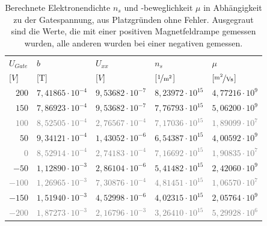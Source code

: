 \begin{table}[h]
	\centering
	\begin{tabular}{|r|r|l|r|r|}
		\hline
		\multicolumn{1}{|l|}{\cellcolor{black!30} $U_{Gate}$ } & \multicolumn{1}{|l|}{\cellcolor{black!30} $b$ } & \multicolumn{1}{|l|}{\cellcolor{black!30} $U_{xx}$ } & \multicolumn{1}{|l|}{\cellcolor{black!30} $n_s$ } & \multicolumn{1}{|l|}{\cellcolor{black!30} $\mu$ } \\
		\multicolumn{1}{|l|}{\cellcolor{black!30} [$\unit{V}$] } &  \multicolumn{1}{|l|}{\cellcolor{black!30} [\unit{T}] } &
		\multicolumn{1}{|l|}{\cellcolor{black!30} [$\unit{V}$] } &  \multicolumn{1}{|l|}{\cellcolor{black!30} [$\unitfrac{1}{m^2}$] } & \multicolumn{1}{|l|}{\cellcolor{black!30} [$\unitfrac{m^2}{Vs}$] } \\ \hline
		$ 200 $  & $ 7,41865\cdot 10^{-4} $  & $ 9,53682\cdot 10^{-7} $  & $ 8,23972\cdot 10^{15} $  & $ 4,77216\cdot 10^{9} $  \\ 
		$ 150 $  & $ 7,86923\cdot 10^{-4} $  & $ 9,53682\cdot 10^{-7} $  & $ 7,76793\cdot 10^{15} $  & $ 5,06200\cdot 10^{9} $  \\ 
		\textcolor{gray}{$ 100 $}  & \textcolor{gray}{$ 8,52505\cdot 10^{-4} $}  & \textcolor{gray}{$ 2,76567\cdot 10^{-4} $}  & \textcolor{gray}{$ 7,17036\cdot 10^{15} $}  & \textcolor{gray}{$ 1,89099\cdot 10^{7} $}  \\ 
		$ 50 $  & $ 9,34121\cdot 10^{-4} $  & $ 1,43052\cdot 10^{-6} $  & $ 6,54387\cdot 10^{15} $  & $ 4,00592\cdot 10^{9} $  \\ 
		\textcolor{gray}{$ 0 $}  & \textcolor{gray}{$ 8,52914\cdot 10^{-4} $}  & \textcolor{gray}{$ 2,74183\cdot 10^{-4} $}  & \textcolor{gray}{$ 7,16692\cdot 10^{15} $}  & \textcolor{gray}{$ 1,90835\cdot 10^{7} $}  \\ 
		$ -50 $  & $ 1,12890\cdot 10^{-3} $  & $ 2,86104\cdot 10^{-6} $  & $ 5,41482\cdot 10^{15} $  & $ 2,42060\cdot 10^{9} $  \\ 
		\textcolor{gray}{$ -100 $}  & \textcolor{gray}{$ 1,26965\cdot 10^{-3} $}  & \textcolor{gray}{$ 7,30876\cdot 10^{-4} $}  & \textcolor{gray}{$ 4,81451\cdot 10^{15} $}  & \textcolor{gray}{$ 1,06570\cdot 10^{7} $}  \\ 
		$ -150 $  & $ 1,51940\cdot 10^{-3} $  & $ 4,52998\cdot 10^{-6} $  & $ 4,02315\cdot 10^{15} $  & $ 2,05764\cdot 10^{9} $  \\ 
		\textcolor{gray}{$ -200 $}  & \textcolor{gray}{$ 1,87273\cdot 10^{-3} $}  & \textcolor{gray}{$ 2,16796\cdot 10^{-3} $}  & \textcolor{gray}{$ 3,26410\cdot 10^{15} $}  & \textcolor{gray}{$ 5,29928\cdot 10^{6} $}  \\ \hline
	\end{tabular}
	\caption{Berechnete Elektronendichte $n_s$ und -beweglichkeit $\mu$ in Abhängigkeit zu der Gatespannung, aus Platzgründen ohne Fehler. Ausgegraut sind die Werte, die mit einer positiven Magnetfeldrampe gemessen wurden, alle anderen wurden bei einer negativen gemessen.}
	\label{tab:gate_ausw}
\end{table}

